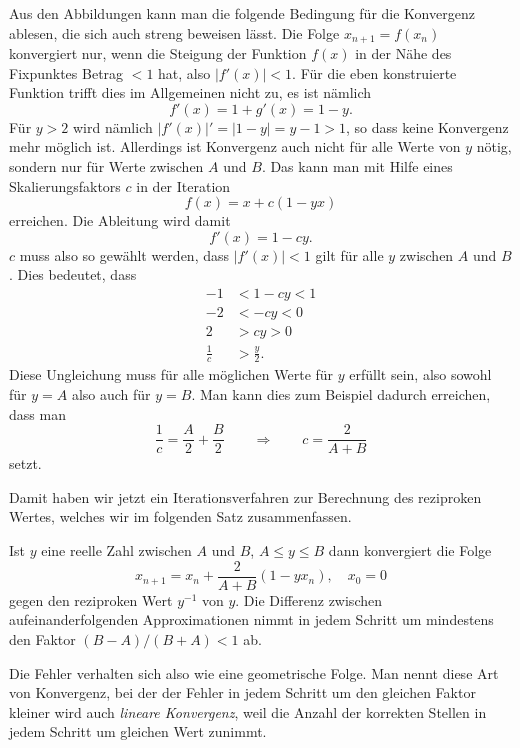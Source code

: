 Aus den Abbildungen kann man die folgende Bedingung für die Konvergenz
ablesen, die sich auch streng beweisen lässt.
Die Folge $x_{n+1} = f(x_n)$ konvergiert nur, wenn die Steigung
der Funktion $f(x)$ in der Nähe des Fixpunktes Betrag $<1$ hat, 
also $|f'(x)|<1$.
Für die eben konstruierte Funktion trifft dies im Allgemeinen nicht zu,
es ist nämlich
\[
f'(x) = 1 + g'(x) = 1 - y.
\]
Für $y>2$ wird nämlich $|f'(x)|'=|1-y| = y-1 >1$, so dass keine Konvergenz
mehr möglich ist.
Allerdings ist Konvergenz auch nicht für alle Werte von $y$ nötig, sondern
nur für Werte zwischen $A$ und $B$.
Das kann man mit Hilfe eines Skalierungsfaktors $c$ in der Iteration
\[
f(x) = x + c(1-yx)
\]
erreichen.
Die Ableitung wird damit
\[
f'(x) = 1-cy.
\]
$c$  muss also so gewählt werden, dass $|f'(x)|<1$ gilt für alle $y$
zwischen $A$ und $B$.
Dies bedeutet, dass
\begin{align*}
-1 &< 1-cy < 1 \\
-2 &< -cy < 0 \\
2 &> cy > 0 \\
\frac1c &> \frac{y}2.
\end{align*}
Diese Ungleichung muss für alle möglichen Werte für $y$ erfüllt sein,
also sowohl für $y=A$ also auch für $y=B$.
Man kann dies zum Beispiel dadurch erreichen, dass man
\[
\frac1c = \frac{A}2 + \frac{B}2
\qquad\Rightarrow\qquad
c = \frac{2}{A+B}
\]
setzt.

Damit haben wir jetzt ein Iterationsverfahren zur Berechnung des 
reziproken Wertes, welches wir im folgenden Satz zusammenfassen.

\begin{satz}
\label{satz:reziprok}
Ist $y$ eine reelle Zahl zwischen $A$ und $B$, $A\le y\le B$ dann
konvergiert die Folge
\[
x_{n+1} = x_n + \frac{2}{A+B}(1-yx_n), \quad x_0 = 0
\]
gegen den reziproken Wert $y^{-1}$ von $y$.
Die Differenz zwischen aufeinanderfolgenden Approximationen nimmt
in jedem Schritt um mindestens den Faktor $(B-A)/(B+A)<1$ ab.
\end{satz}

Die Fehler verhalten sich also wie eine geometrische Folge.
%
Man nennt diese Art von Konvergenz, bei der der Fehler in jedem
Schritt um den gleichen Faktor kleiner wird auch {\em lineare Konvergenz},
%
weil die Anzahl der korrekten Stellen in jedem Schritt um gleichen
Wert zunimmt.

